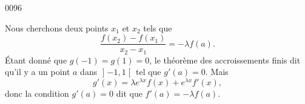 
\begin{corrige}{0096}

Nous cherchons deux points $x_1$ et $x_2$ tels que
\begin{equation}
	\frac{ f(x_2)-f(x_1) }{ x_2-x_1 }=-\lambda f(a).
\end{equation}
Étant donné que $g(-1)=g(1)=0$, le théorème des accroissements finis dit qu'il y a un point $a$ dans $\mathopen]-1,1\mathclose[$ tel que $g'(a)=0$. Mais
\begin{equation}
	g'(x)=\lambda e^{\lambda x}f(x)+ e^{\lambda x}f'(x),
\end{equation}
donc la condition $g'(a)=0$ dit que $f'(a)=-\lambda f(a)$.

\end{corrige}
